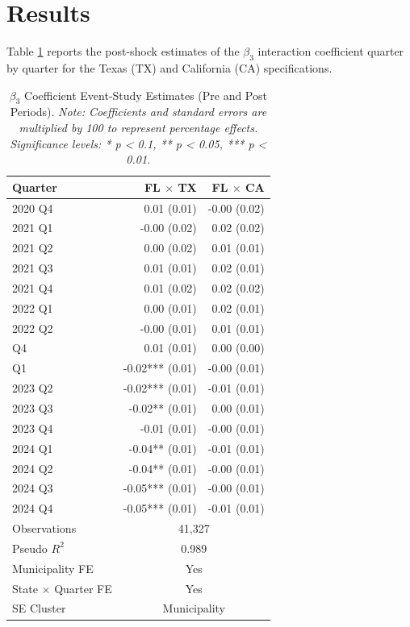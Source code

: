 \section{Results}
Table \ref{tab:spillovers_tx_ca} reports the post-shock estimates of the $\beta_3$ interaction coefficient quarter by quarter for the Texas (TX) and California (CA) specifications. 
{\renewcommand{\arraystretch}{1.25}
\setlength{\tabcolsep}{22pt}
\begin{table}[H]

\caption{$\beta_3$ Coefficient Event-Study Estimates (Pre and Post Periods). \textit{Note: Coefficients and standard errors are multiplied by 100 to represent percentage effects. Significance levels: * p < 0.1, ** p < 0.05, *** p < 0.01.} \label{tab:spillovers_tx_ca}}
\centering
\begin{tabular}[t]{lrr}
\toprule
Quarter & FL $\times$ TX & FL $\times$ CA\\
\midrule
2020 Q4 & 0.01\phantom{***} (0.01) & -0.00\phantom{***} (0.02)\\
2021 Q1 & -0.00\phantom{***} (0.02) & 0.02\phantom{***} (0.02)\\
2021 Q2 & 0.00\phantom{***} (0.02) & 0.01\phantom{***} (0.01)\\
2021 Q3 & 0.01\phantom{***} (0.01) & 0.02\phantom{***} (0.01)\\
2021 Q4 & 0.01\phantom{***} (0.02) & 0.02\phantom{***} (0.02)\\
2022 Q1 & 0.00\phantom{***} (0.01) & 0.02\phantom{***} (0.01)\\
2022 Q2 & -0.00\phantom{***} (0.01) & 0.01\phantom{***} (0.01)\\
\addlinespace
2022 Q4 & 0.01\phantom{***} (0.01) & 0.00\phantom{***} (0.00)\\
\addlinespace
2023 Q1 & -0.02*** (0.01) & -0.00\phantom{***} (0.01)\\
2023 Q2 & -0.02*** (0.01) & -0.01\phantom{***} (0.01)\\
2023 Q3 & -0.02**\phantom{*} (0.01) & 0.00\phantom{***} (0.01)\\
2023 Q4 & -0.01\phantom{***} (0.01) & -0.00\phantom{***} (0.01)\\
2024 Q1 & -0.04**\phantom{*} (0.01) & -0.01\phantom{***} (0.01)\\
2024 Q2 & -0.04**\phantom{*} (0.01) & -0.00\phantom{***} (0.01)\\
2024 Q3 & -0.05*** (0.01) & -0.00\phantom{***} (0.01)\\
2024 Q4 & -0.05*** (0.01) & -0.01\phantom{***} (0.01)\\
\midrule
Observations & \multicolumn{2}{c}{41,327} \\
Pseudo $R^2$ & \multicolumn{2}{c}{0.989} \\
Municipality FE & \multicolumn{2}{c}{Yes} \\
State $\times$ Quarter FE & \multicolumn{2}{c}{Yes} \\
SE Cluster & \multicolumn{2}{c}{Municipality} \\
\bottomrule
\end{tabular}
\end{table}
}


